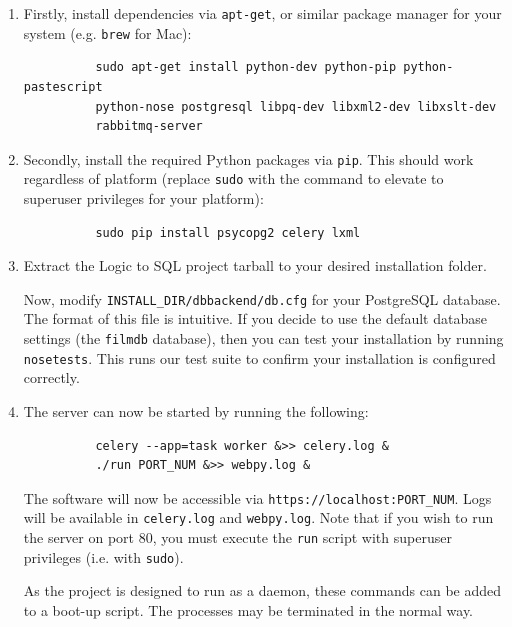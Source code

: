 \documentclass[a4paper, 11pt]{article}
\begin{document}
    \begin{enumerate}
      \item Firstly, install dependencies via \texttt{apt-get}, or similar
        package manager for your system (e.g. \texttt{brew} for Mac):
        \begin{verbatim}
          sudo apt-get install python-dev python-pip python-pastescript
          python-nose postgresql libpq-dev libxml2-dev libxslt-dev
          rabbitmq-server
        \end{verbatim}

      \item Secondly, install the required Python packages via \texttt{pip}.
        This should work regardless of platform (replace \texttt{sudo} with the
        command to elevate to superuser privileges for your platform):
        \begin{verbatim}
          sudo pip install psycopg2 celery lxml
        \end{verbatim}

      \item Extract the Logic to SQL project tarball to your desired
        installation folder.

        Now, modify \texttt{INSTALL\_DIR/dbbackend/db.cfg} for your PostgreSQL
        database. The format of this file is intuitive. If you decide to use
        the default database settings (the \texttt{filmdb} database), then you
        can test your installation by running \texttt{nosetests}. This runs
        our test suite to confirm your installation is configured correctly.

      \item The server can now be started by running the following:

        \begin{verbatim}
          celery --app=task worker &>> celery.log &
          ./run PORT_NUM &>> webpy.log &
        \end{verbatim}

        The software will now be accessible via
        \texttt{https://localhost:PORT\_NUM}. Logs will be available in
        \texttt{celery.log} and \texttt{webpy.log}. Note that if you wish to
        run the server on port 80, you must execute the \texttt{run} script
        with superuser privileges (i.e. with \texttt{sudo}).

        As the project is designed to run as a daemon, these commands can be
        added to a boot-up script. The processes may be terminated in the
        normal way.
    \end{enumerate}
\end{document}
